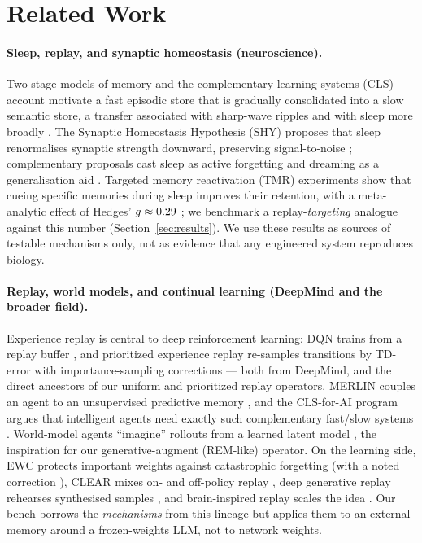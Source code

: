 \section{Related Work}\label{sec:related}

\paragraph{Sleep, replay, and synaptic homeostasis (neuroscience).}
Two-stage models of memory \citep{buzsaki1989twostage} and the complementary
learning systems (CLS) account \citep{mcclelland1995cls} motivate a fast
episodic store that is gradually consolidated into a slow semantic store, a
transfer associated with sharp-wave ripples \citep{buzsaki2015ripples} and with
sleep more broadly \citep{diekelmann2010memory,rasch2013sleep,klinzing2019systems}.
The Synaptic Homeostasis Hypothesis (SHY) proposes that sleep renormalises
synaptic strength downward, preserving signal-to-noise
\citep{tononi2006shy,tononi2014price,tononi2020downselection}; complementary
proposals cast sleep as active forgetting \citep{crick1983dreamsleep,poe2017forgetting}
and dreaming as a generalisation aid \citep{hoel2021overfitted}. Targeted memory
reactivation (TMR) experiments show that cueing specific memories during sleep
improves their retention, with a meta-analytic effect of Hedges'
$g\approx0.29$ \citep{hu2020tmr}; we benchmark a replay-\emph{targeting}
analogue against this number (Section~\ref{sec:results}). We use these results
as sources of testable mechanisms only, not as evidence that any engineered
system reproduces biology.

\paragraph{Replay, world models, and continual learning (DeepMind and the
broader field).} Experience replay is central to deep reinforcement learning:
DQN trains from a replay buffer \citep{mnih2015dqn}, and prioritized experience
replay re-samples transitions by TD-error with importance-sampling corrections
\citep{schaul2016per} --- both from DeepMind, and the direct ancestors of our
uniform and prioritized replay operators. MERLIN couples an agent to an
unsupervised predictive memory \citep{wayne2018merlin}, and the CLS-for-AI
program argues that intelligent agents need exactly such complementary fast/slow
systems \citep{kumaran2016cls,hassabis2017neuroai}. World-model agents
``imagine'' rollouts from a learned latent model
\citep{ha2018worldmodels,hafner2020dreamer,hafner2025dreamerv3,bruce2024genie},
the inspiration for our generative-augment (REM-like) operator. On the learning
side, EWC protects important weights against catastrophic forgetting
\citep{kirkpatrick2017ewc} (with a noted correction
\citealp{huszar2018ewcnote}), CLEAR mixes on- and off-policy replay
\citep{rolnick2019clear}, deep generative replay rehearses synthesised samples
\citep{shin2017generativereplay}, and brain-inspired replay scales the idea
\citep{vandeven2020brainreplay}. Our bench borrows the \emph{mechanisms} from
this lineage but applies them to an external memory around a frozen-weights LLM,
not to network weights.

